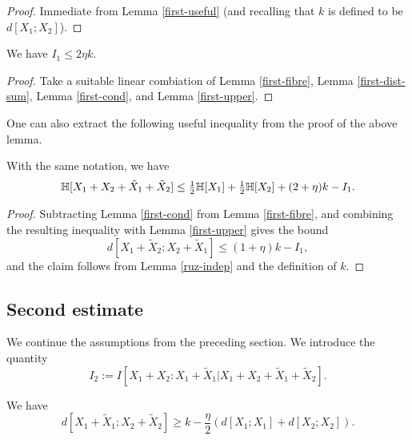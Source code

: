 \begin{proof} \leanok  Immediate from Lemma \ref{first-useful} (and recalling that $k$ is defined to be $d[X_1;X_2]$).
\end{proof}

\begin{lemma}\label{first-estimate}
  \leanok We have $I_1 \leq 2 \eta k$.
\end{lemma}

\begin{proof}  Take a suitable linear combiation of Lemma \ref{first-fibre}, Lemma \ref{first-dist-sum}, Lemma \ref{first-cond}, and Lemma \ref{first-upper}.
\end{proof}

One can also extract the following useful inequality from the proof of the above lemma.

\begin{lemma}\label{foursum-bound}
  \leanok
  With the same notation, we have
  \begin{equation}
    \label{HS-bound}
    \mathbb{H}[X_1+X_2+\tilde X_1+\tilde X_2] \le \tfrac{1}{2} \mathbb{H}[X_1]+\tfrac{1}{2} \mathbb{H}[X_2] + (2 + \eta) k - I_1.
  \end{equation}
\end{lemma}

\begin{proof}
  Subtracting Lemma \ref{first-cond} from Lemma \ref{first-fibre}, and combining the resulting inequality with Lemma \ref{first-upper} gives the bound
\[
  d[X_1+\tilde X_2;X_2+\tilde X_1] \le (1 + \eta) k - I_1,
\]
and the claim follows from Lemma \ref{ruz-indep} and the definition of $k$.
\end{proof}


\subsection{Second estimate}

We continue the assumptions from the preceding section.
We introduce the quantity
$$ I_2 := I[ X_1+X_2 : X_1 + \tilde X_1 | X_1+X_2+\tilde X_1+\tilde X_2 ].$$

\begin{lemma}\label{dist-sums}
  \leanok
We have
$$ d[X_1+\tilde X_1; X_2+\tilde X_2] \geq k - \frac{\eta}{2} ( d[X_1; X_1] + d[X_2;X_2] ).$$
\end{lemma}

